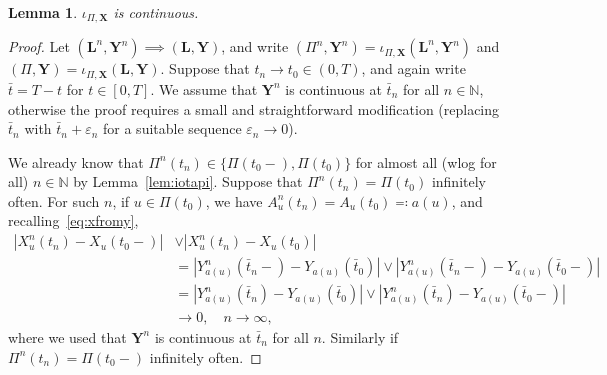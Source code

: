 \documentclass[reqno,draft]{amsart}
\numberwithin{equation}{section}
\theoremstyle{plain}
\newtheorem{lemma}[theorem]{Lemma}
\theoremstyle{remark}
\newcommand{\N}{\mathbb{N}} %
\newcommand{\tendsto}[1]{\stackrel{#1}{\longrightarrow}}
\newcommand{\fpart}{\Pi} %
\begin{document}
\begin{lemma}\label{lem:iotapix}
    $\iota_{\fpart,\boldsymbol X}$ is continuous.
\end{lemma}
\begin{proof}
    Let $(\boldsymbol L^n,\boldsymbol Y^n) \implies (\boldsymbol L,\boldsymbol Y)$, and write $(\fpart^n,\boldsymbol Y^n) = \iota_{\fpart,\boldsymbol X}(\boldsymbol L^n,\boldsymbol Y^n)$ and $(\fpart,\boldsymbol Y) = \iota_{\fpart,\boldsymbol X}(\boldsymbol L,\boldsymbol Y)$.
    Suppose that $t_n \to t_0 \in (0,T)$, and again write $\bar{t} = T-t$ for $t\in [0,T]$. We assume that $\boldsymbol Y^n$ is continuous at $\bar{t}_n$ for all $n\in \N$, otherwise the proof requires a small and straightforward modification (replacing $\bar{t}_n$ with $\bar{t}_n + \varepsilon_n$ for a suitable sequence $\varepsilon_n \to 0$).

    We already know that $\fpart^n(t_n) \in \{\fpart(t_0-),\fpart(t_0)\}$ for almost all (wlog for all) $n\in \N$ by Lemma~\ref{lem:iotapi}. Suppose that $\fpart^n(t_n) = \fpart(t_0)$ infinitely often. For such $n$, if $u\in \fpart(t_0)$, we have $A^n_u(t_n) = A_u(t_0) \eqqcolon a(u)$, and recalling~\eqref{eq:xfromy},
    \begin{align*}
        |X^n_u(t_n) - X_u(t_0-)| & \vee |X^n_u(t_n) - X_u(t_0)|\\
        &= |Y^n_{a(u)}(\bar{t}_n-) - Y_{a(u)}(\bar{t}_0)| \vee |Y^n_{a(u)}(\bar{t}_n-) - Y_{a(u)}(\bar{t}_0-)|\\
        &= |Y^n_{a(u)}(\bar{t}_n) - Y_{a(u)}(\bar{t}_0)| \vee |Y^n_{a(u)}(\bar{t}_n) - Y_{a(u)}(\bar{t}_0-)|\\
        &\tendsto{} 0,\quad n\to \infty,
    \end{align*}
    where we used that $\boldsymbol Y^n$ is continuous at $\bar{t}_n$ for all $n$.
    Similarly if $\fpart^n(t_n) = \fpart(t_0-)$ infinitely often.


\end{proof}
\end{document}
